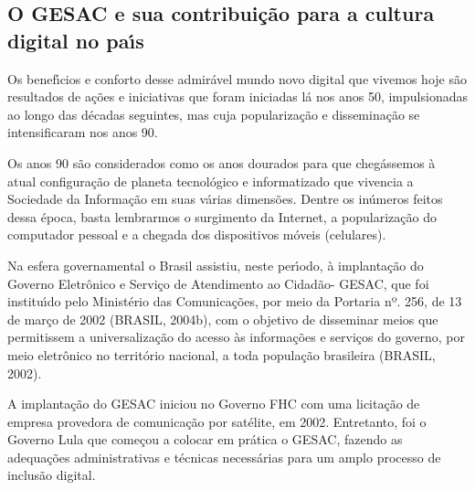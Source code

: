 \documentclass[
12pt,		%
openright,	%
twoside,  %
a4paper,			%
chapter=TITLE,		%
english,			%
french,				%
spanish,			%
brazil				%
]{USPSC-classe/USPSC}
\begin{document}
\subsection[O GESAC e sua contribui\c{c}\~ao para  a cultura  digital  no pa\'{\i}s]{O GESAC e sua contribui\c{c}\~ao para  a cultura  digital  no pa\'{\i}s}\label{O GESAC e sua contribui\c{c}\~ao para  a cultura  digital  no pa\'{\i}s}
Os benef\'{\i}cios e conforto desse admir\'avel mundo novo digital que vivemos hoje s\~ao resultados de a\c{c}\~oes e iniciativas que foram iniciadas l\'a nos anos 50, impulsionadas ao longo das d\'ecadas seguintes, mas cuja populariza\c{c}\~ao e dissemina\c{c}\~ao se intensificaram nos anos 90.














Os anos 90 s\~ao considerados como os anos dourados para que cheg\'assemos \`a atual configura\c{c}\~ao de planeta tecnol\'ogico e informatizado que vivencia a Sociedade da Informa\c{c}\~ao em suas v\'arias dimens\~oes. Dentre os  in\'umeros feitos dessa \'epoca, basta lembrarmos o surgimento da Internet, a populariza\c{c}\~ao do computador pessoal e a chegada dos dispositivos m\'oveis (celulares).














Na esfera governamental o Brasil assistiu, neste per\'{\i}odo, \`a implanta\c{c}\~ao do Governo Eletr\^onico e Servi\c{c}o de Atendimento ao Cidad\~ao-  GESAC, que foi institu\'{\i}do pelo Minist\'erio das Comunica\c{c}\~oes, por meio  da Portaria nº. 256, de 13 de mar\c{c}o de 2002 (BRASIL, 2004b), com o objetivo de disseminar meios que permitissem a universaliza\c{c}\~ao do acesso \`as informa\c{c}\~oes e servi\c{c}os do governo, por meio eletr\^onico no territ\'orio nacional, a toda popula\c{c}\~ao brasileira (BRASIL, 2002).














A  implanta\c{c}\~ao do GESAC iniciou no Governo FHC com uma licita\c{c}\~ao  de empresa provedora de comunica\c{c}\~ao por sat\'elite, em 2002.  Entretanto, foi o Governo Lula  que come\c{c}ou  a colocar em pr\'atica o GESAC, fazendo as adequa\c{c}\~oes administrativas e t\'ecnicas necess\'arias para um amplo processo de inclus\~ao digital.
\end{document}
